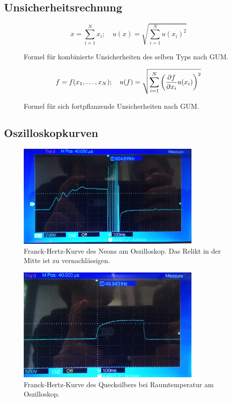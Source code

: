 \subsection{Unsicherheitsrechnung}\label{VGuD}

\begin{figure}[h]
	\begin{equation*}
		x = \sum_{i=1}^{N} x_i
		;\quad
		u(x) = \sqrt{\sum_{i = 1}^{N} u(x_i)^2}
	\end{equation*}
	\caption{Formel für kombinierte Unsicherheiten des selben Typs nach GUM.}
	\label{fig:GUM_combine}
\end{figure}

\begin{figure}[h]
	\begin{equation*}
		f = f(x_1, \dots , x_N)
		;\quad
		u(f) = \sqrt{\sum_{i = 1}^{N}\left(\pdv{f}{x_i} u(x_i)\right) ^2}
	\end{equation*}
	\caption{Formel für sich fortpflanzende Unsicherheiten nach GUM.}
	\label{fig:GUM_formula}
\end{figure}

\subsection{Oszilloskopkurven}

\begin{figure}[ht]
	\centering
	\includegraphics[width=0.8\textwidth]{bilder/ne.jpg}
	\caption{Franck-Hertz-Kurve des Neons am Oszilloskop. Das Relikt in der Mitte ist zu vernachlässigen.}
	\label{fig:kurveNe}	
\end{figure}

\begin{figure}[ht]
	\centering
	\includegraphics[width=0.8\textwidth]{bilder/hgl.jpg}
	\caption{Franck-Hertz-Kurve des Quecksilbers bei Raumtemperatur am Oszilloskop.}
	\label{fig:kurveHgl}	
\end{figure}

